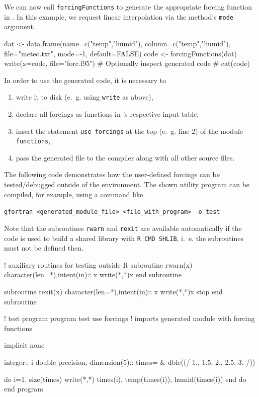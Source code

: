 \documentclass[onecolumn]{article}
\begin{document}
We can now call \verb|forcingFunctions| to generate the  appropriate forcing function in . In this example, we request linear interpolation via the method's \verb|mode| argument.

\begin{Schunk}
\begin{Sinput}
 dat <- data.frame(name=c("temp","humid"),
   column=c("temp","humid"), file="meteo.txt", mode=-1, default=FALSE)
 code <- forcingFunctions(dat)
 write(x=code, file="forc.f95")
 # Optionally inspect generated code
 # cat(code)
\end{Sinput}
\end{Schunk}

In order to use the generated code, it is necessary to
\begin{enumerate}
\item write it to disk (e.~g. using \verb|write| as above),
\item declare all forcings as functions in 's respective input table,
\item insert the statement \verb|use forcings| at the top (e.~g. line 2) of the  module \verb|functions|,
\item pass the generated file to the compiler along with all other  source files.
\end{enumerate}

The following  code demonstrates how the user-defined forcings can be tested/debugged outside of the  environment. The shown utility program can be compiled, for example, using a command like

\medskip
\verb|gfortran <generated_module_file> <file_with_program> -o test|

\medskip
Note that the subroutines \verb|rwarn| and \verb|rexit| are available automatically if the code is used to build a shared library with \verb|R CMD SHLIB|, i.~e. the subroutines must not be defined then.

\begin{shaded}
\begin{Schunk}
\begin{Soutput}
 ! auxiliary routines for testing outside R 
 subroutine rwarn(x) 
   character(len=*),intent(in):: x 
   write(*,*)x 
 end subroutine 
  
 subroutine rexit(x) 
   character(len=*),intent(in):: x 
   write(*,*)x 
   stop 
 end subroutine 
  
 ! test program 
 program test 
 use forcings  ! imports generated module with forcing functions 
  
 implicit none 
  
 integer:: i 
 double precision, dimension(5):: times= & 
   dble((/ 1., 1.5, 2., 2.5, 3. /)) 
  
 do i=1, size(times) 
   write(*,*) times(i), temp(times(i)), humid(times(i)) 
 end do 
 end program 
\end{Soutput}
\end{Schunk}
\end{shaded}
\end{document}
